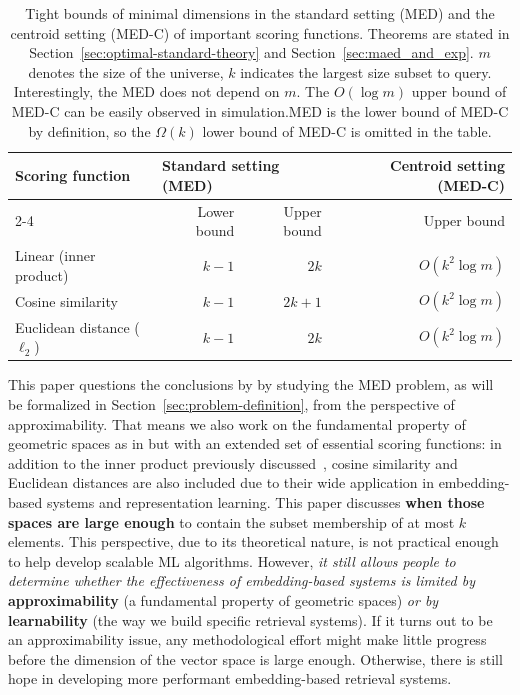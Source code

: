 \documentclass[10pt]{article}
\begin{document}
\begin{table}[]
\caption{Tight bounds of minimal dimensions in the standard setting (MED) and the centroid setting (MED-C) of important scoring functions. Theorems are stated in Section~\ref{sec:optimal-standard-theory} and Section~\ref{sec:maed_and_exp}. $m$ denotes the size of the universe, $k$ indicates the largest size subset to query. Interestingly, the MED does not depend on $m$. The $O(\log m)$ upper bound of MED-C can be easily observed in simulation.MED is the lower bound of MED-C by definition, so the $\Omega(k)$ lower bound of MED-C is omitted in the table.}\label{tab:major_results}
\centering
\begin{tabular}{lrrr}
\toprule
\multirow{2}{*}{Scoring function} & \multicolumn{2}{l}{Standard setting (MED)} & Centroid setting (MED-C) \\\cmidrule{2-4}
                                  & Lower bound       & Upper bound      & Upper bound                             \\\midrule
Linear (inner product)            & $k-1$             & $2k$             & $O(k^2\log m)$                             \\
Cosine similarity                 & $k-1$             & $2k+1$           & $O(k^2\log m)$                              \\
Euclidean distance ($\ell_2$)     & $k-1$             & $2k$             & $O(k^2\log m)$                            \\\bottomrule
\end{tabular}
\end{table}


This paper questions the conclusions by \cite{weller2025theoretical} by studying the MED problem, as will be formalized in Section~\ref{sec:problem-definition}, from the perspective of approximability. That means we also work on the fundamental property of geometric spaces as in \cite{weller2025theoretical} but with an extended set of essential scoring functions: in addition to the inner product previously discussed~\cite{weller2025theoretical}, cosine similarity and Euclidean distances are also included due to their wide application in embedding-based systems and representation learning. This paper discusses \textbf{when those spaces are large enough} to contain the subset membership of at most $k$ elements. This perspective, due to its theoretical nature, is not practical enough to help develop scalable ML algorithms. However, \textit{it still allows people to determine whether the effectiveness of embedding-based systems is limited by} \textbf{approximability} (a fundamental property of geometric spaces) \textit{or by} \textbf{learnability} (the way we build specific retrieval systems). If it turns out to be an approximability issue, any methodological effort might make little progress before the dimension of the vector space is large enough. Otherwise, there is still hope in developing more performant embedding-based retrieval systems.
\end{document}
